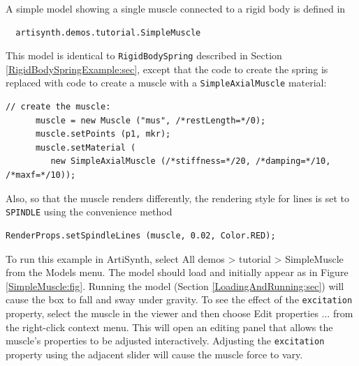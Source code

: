 A simple model showing a single muscle connected to a rigid
body is defined in
%
\begin{verbatim}
  artisynth.demos.tutorial.SimpleMuscle
\end{verbatim}
%

This model is identical to {\tt RigidBodySpring} described in Section
\ref{RigidBodySpringExample:sec}, except that the code to create
the spring is replaced with code to create a muscle
with a {\tt SimpleAxialMuscle} material:
%
\begin{lstlisting}[]
      // create the muscle:      
      muscle = new Muscle ("mus", /*restLength=*/0);
      muscle.setPoints (p1, mkr);
      muscle.setMaterial (
         new SimpleAxialMuscle (/*stiffness=*/20, /*damping=*/10, /*maxf=*/10));
\end{lstlisting}
%
Also, so that the muscle renders differently, the rendering style
for lines is set to {\tt SPINDLE} using the convenience method
%
\begin{lstlisting}[]
      RenderProps.setSpindleLines (muscle, 0.02, Color.RED);
\end{lstlisting}
%

To run this example in ArtiSynth, select {\sf All demos > tutorial >
SimpleMuscle} from the {\sf Models} menu. The model should load and
initially appear as in Figure \ref{SimpleMuscle:fig}.  Running the
model (Section \ref{LoadingAndRunning:sec}) will cause the box to fall
and sway under gravity. To see the effect of the {\tt excitation}
property, select the muscle in the viewer and then choose {\sf Edit
properties ...} from the right-click context menu.  This will open an
editing panel that allows the muscle's properties to be adjusted
interactively. Adjusting the {\tt excitation} property using the
adjacent slider will cause the muscle force to vary.



